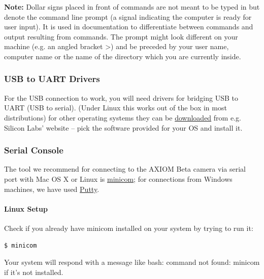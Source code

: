 \textbf{Note:} Dollar signs placed in front of commands are not meant to be typed in but denote the command line prompt (a signal indicating the computer is ready for user input). It is used in documentation to differentiate between commands and output resulting from commands. The prompt might look different on your machine (e.g. an angled bracket >) and be preceded by your user name, computer name or the name of the directory which you are currently inside.



\subsubsection{USB to UART Drivers}

For the USB connection to work, you will need drivers for bridging USB to UART (USB to serial). (Under Linux this works out of the box in most 	distributions) for other operating systems they can be \href{https://www.silabs.com/products/development-tools/software/usb-to-uart-bridge-vcp-drivers}{downloaded} from e.g. Silicon Labs' website – pick the software provided for your OS and install it. \\

\subsubsection{Serial Console}

The tool we recommend for connecting to the AXIOM Beta camera via serial port with Mac OS X or Linux is \href{https://linux.die.net/man/1/minicom}{minicom}; for connections from Windows machines, we have used \href{http://www.putty.org/}{Putty}.

\paragraph{Linux Setup}

Check if you already have minicom installed on your system by trying to run it:

\begin{lstlisting}[language=bash,morekeywords=$,keywordstyle=\bfseries,frame=none,xleftmargin=.25in,belowskip=2em, aboveskip=2em]
$ minicom
\end{lstlisting}

Your system will respond with a message like bash: command not found: minicom if it's not installed.





